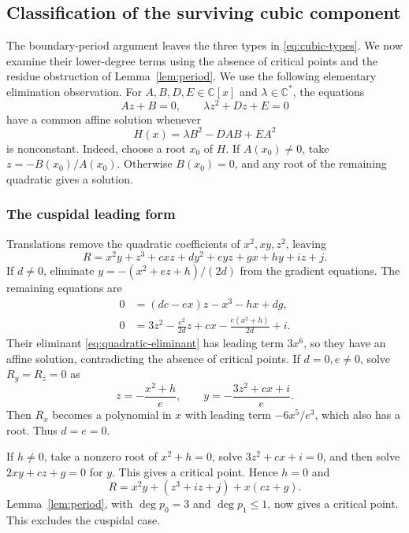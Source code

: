 \documentclass[11pt,reqno]{amsart}
\numberwithin{equation}{section}
\theoremstyle{plain}
\theoremstyle{definition}
\theoremstyle{remark}
\newcommand{\C}{\mathbb C}
\begin{document}
\subsection{Classification of the surviving cubic component}\label{sec:cubic-classification}
The boundary-period argument leaves the three types in
\eqref{eq:cubic-types}. We now examine their lower-degree terms using the
absence of critical points and the residue obstruction of
Lemma~\ref{lem:period}.
We use the following elementary elimination observation.
For $A,B,D,E\in\C[x]$ and $\lambda\in\C^*$, the equations
\[
Az+B=0,\qquad \lambda z^2+Dz+E=0
\]
have a common affine solution whenever
\begin{equation}\label{eq:quadratic-eliminant}
H(x)=\lambda B^2-DAB+EA^2
\end{equation}
is nonconstant. Indeed, choose a root $x_0$ of $H$. If $A(x_0)\ne0$, take $z=-B(x_0)/A(x_0)$. Otherwise $B(x_0)=0$, and any root of the remaining quadratic gives a solution.

\subsubsection{The cuspidal leading form}
Translations remove the quadratic coefficients of $x^2,xy,z^2$, leaving
\begin{equation}\label{eq:cusp-normal}
R=x^2y+z^3+cxz+dy^2+eyz+gx+hy+iz+j.
\end{equation}
If $d\ne0$, eliminate $y=-(x^2+ez+h)/(2d)$ from the gradient equations. The remaining equations are
\[
\begin{split}
0&=(dc-ex)z-x^3-hx+dg,\\
0&=3z^2-\frac{e^2}{2d}z+cx-\frac{e(x^2+h)}{2d}+i.
\end{split}
\]
Their eliminant \eqref{eq:quadratic-eliminant} has leading term $3x^6$, so they have an affine solution, contradicting the absence of critical points.
If $d=0,e\ne0$, solve $R_y=R_z=0$ as
\[
z=-\frac{x^2+h}{e},\qquad y=-\frac{3z^2+cx+i}{e}.
\]
Then $R_x$ becomes a polynomial in $x$ with leading term $-6x^5/e^3$, which also has a root.
Thus $d=e=0$.

If $h\ne0$, take a nonzero root of $x^2+h=0$, solve $3z^2+cx+i=0$, and then solve $2xy+cz+g=0$ for $y$. This gives a critical point. Hence $h=0$ and
\[
R=x^2y+(z^3+iz+j)+x(cz+g).
\]
Lemma~\ref{lem:period}, with $\deg p_0=3$ and $\deg p_1\le1$, now gives a critical point. This excludes the cuspidal case.
\end{document}
